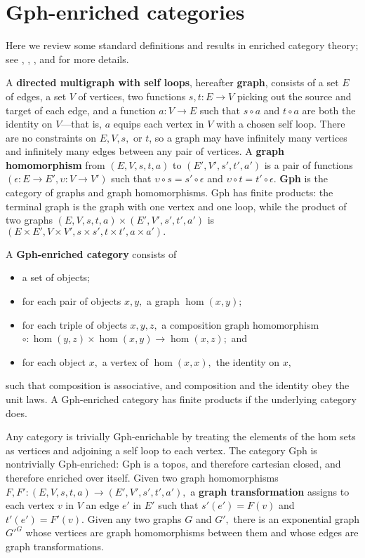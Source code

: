 \documentclass[a4paper,UKenglish]{lipics-v2016}
\newcommand{\maps}{\colon}
\begin{document}
\section{Gph-enriched categories}
Here we review some standard definitions and results in enriched category theory; see \cite{CIS-335497}, \cite{Power99EnrichedLawvereTheories}, \cite{DBLP:journals/acs/LackR11}, and \cite{Trimble} for more details.

A {\bf directed multigraph with self loops}, hereafter {\bf graph}, consists of a set $E$ of edges, a set $V$ of vertices, two functions $s,t\maps E \to V$ picking out the source and target of each edge, and a function $a\maps V \to E$ such that $s\circ a$ and $t \circ a$ are both the identity on $V$---that is, $a$ equips each vertex in $V$ with a chosen self loop.  There are no constraints on $E, V, s,$ or $t$, so a graph may have infinitely many vertices and infinitely many edges between any pair of vertices.  A {\bf graph homomorphism} from $(E, V, s, t, a)$ to $(E', V', s', t', a')$ is a pair of functions $(\epsilon\maps E \to E', \upsilon\maps V \to V')$ such that $\upsilon\circ s = s' \circ \epsilon$ and $\upsilon\circ t = t' \circ \epsilon$.  {\bf Gph} is the category of graphs and graph homomorphisms.  Gph has finite products: the terminal graph is the graph with one vertex and one loop, while the product of two graphs $(E, V, s, t, a) \times (E', V', s', t', a')$ is $(E \times E', V \times V', s \times s', t\times t', a \times a').$

A {\bf Gph-enriched category} consists of
\begin{itemize}
  \item a set of objects;
  \item for each pair of objects $x, y,$ a graph $\hom(x,y);$
  \item for each triple of objects $x, y, z,$ a composition graph homomorphism $\circ\maps \hom(y, z) \times \hom(x, y) \to \hom(x, z);$ and
  \item for each object $x,$ a vertex of $\hom(x, x),$ the identity on $x,$
\end{itemize}
such that composition is associative, and composition and the identity obey the unit laws.  A Gph-enriched category has finite products if the underlying category does.

Any category is trivially Gph-enrichable by treating the elements of the hom sets as vertices and adjoining a self loop to each vertex.  The category Gph is nontrivially Gph-enriched: Gph is a topos, and therefore cartesian closed, and therefore enriched over itself.  Given two graph homomorphisms $F, F'\maps (E, V, s, t, a) \to (E', V', s', t', a'),$ a {\bf graph transformation} assigns to each vertex $v$ in $V$ an edge $e'$ in $E'$ such that $s'(e') = F(v)$ and $t'(e') = F'(v).$  Given any two graphs $G$ and $G',$ there is an exponential graph $G'^G$ whose vertices are graph homomorphisms between them and whose edges are graph transformations.
\end{document}
